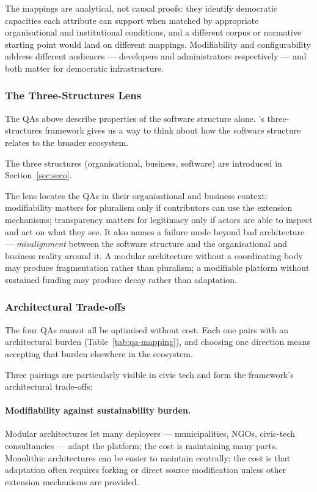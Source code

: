 \documentclass[11pt,a4paper]{article}
\begin{document}
The mappings are analytical, not causal proofs: they identify democratic capacities each attribute can support when matched by appropriate organisational and institutional conditions, and a different corpus or normative starting point would land on different mappings. Modifiability and configurability address different audiences --- developers and administrators respectively --- and both matter for democratic infrastructure.

\subsubsection{The Three-Structures Lens}\label{sec:framework-ts}

The QAs above describe properties of the software structure alone. \citet{christensen2014analysis}'s three-structures framework gives us a way to think about how the software structure relates to the broader ecosystem.

The three structures (organisational, business, software) are introduced in Section~\ref{sec:seco}.

The lens locates the QAs in their organisational and business context: modifiability matters for pluralism only if contributors can use the extension mechanisms; transparency matters for legitimacy only if actors are able to inspect and act on what they see. It also names a failure mode beyond bad architecture --- \emph{misalignment} between the software structure and the organisational and business reality around it. A modular architecture without a coordinating body may produce fragmentation rather than pluralism; a modifiable platform without sustained funding may produce decay rather than adaptation.

\subsubsection{Architectural Trade-offs}\label{sec:framework-tradeoffs}

The four QAs cannot all be optimised without cost. Each one pairs with an architectural burden (Table~\ref{tab:qa-mapping}), and choosing one direction means accepting that burden elsewhere in the ecosystem.

Three pairings are particularly visible in civic tech and form the framework's architectural trade-offs:

\paragraph{Modifiability against sustainability burden.} Modular architectures let many deployers --- municipalities, NGOs, civic-tech consultancies --- adapt the platform; the cost is maintaining many parts. Monolithic architectures can be easier to maintain centrally; the cost is that adaptation often requires forking or direct source modification unless other extension mechanisms are provided.
\end{document}
